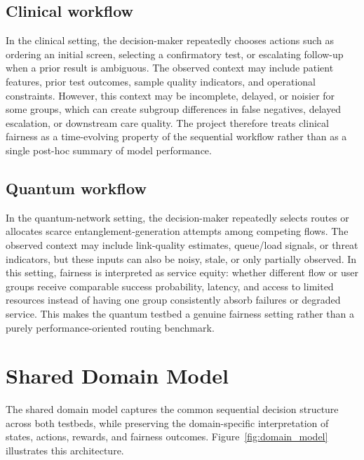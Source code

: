 \documentclass{IEEEtran}
\begin{document}
\subsection{Clinical workflow}
In the clinical setting, the decision-maker repeatedly chooses actions such as
ordering an initial screen, selecting a confirmatory test, or escalating
follow-up when a prior result is ambiguous. The observed context may include
patient features, prior test outcomes, sample quality indicators, and
operational constraints. However, this context may be incomplete, delayed, or
noisier for some groups, which can create subgroup differences in false
negatives, delayed escalation, or downstream care quality. The project
therefore treats clinical fairness as a time-evolving property of the
sequential workflow rather than as a single post-hoc summary of model
performance.

\subsection{Quantum workflow}
In the quantum-network setting, the decision-maker repeatedly selects routes
or allocates scarce entanglement-generation attempts among competing flows.
The observed context may include link-quality estimates, queue/load signals,
or threat indicators, but these inputs can also be noisy, stale, or only
partially observed. In this setting, fairness is interpreted as service
equity: whether different flow or user groups receive comparable success
probability, latency, and access to limited resources instead of having one
group consistently absorb failures or degraded service. This makes the quantum
testbed a genuine fairness setting rather than a purely
performance-oriented routing benchmark.

\section{Shared Domain Model}
The shared domain model captures the common sequential decision structure
across both testbeds, while preserving the domain-specific interpretation of
states, actions, rewards, and fairness outcomes. Figure~\ref{fig:domain_model}
illustrates this architecture.
\end{document}
